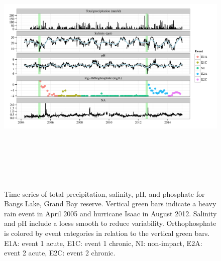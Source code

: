 \documentclass[letterpaper,12pt]{article}\usepackage[]{graphicx}\usepackage[]{color}
\makeatletter
\def\maxwidth{ %
  \ifdim\Gin@nat@width>\linewidth
    \linewidth
  \else
    \Gin@nat@width
  \fi
}
\makeatother
\begin{document}
\begin{landscape}
\centering\vspace*{\fill}
\begin{figure}[!ht]

{\centering \includegraphics[width=\maxwidth,height=5in]{figs/tsplot-1} 

}

\caption[Time series of total precipitation, salinity, pH, and phosphate for Bangs Lake, Grand Bay reserve]{Time series of total precipitation, salinity, pH, and phosphate for Bangs Lake, Grand Bay reserve.  Vertical green bars indicate a heavy rain event in April 2005 and hurricane Isaac in August 2012.  Salinity and pH include a loess smooth to reduce variability. Orthophosphate is colored by event categories in relation to the vertical green bars.  E1A: event 1 acute, E1C: event 1 chronic, NI: non-impact, E2A: event 2 acute, E2C: event 2 chronic.}\label{fig:tsplot}
\end{figure}


\end{landscape}
\clearpage
\end{document}
